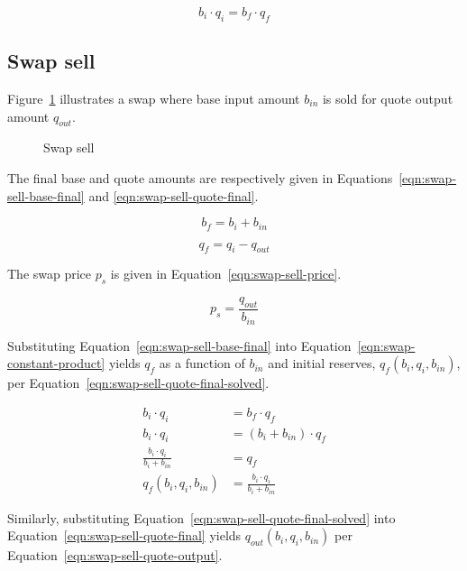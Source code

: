 \documentclass[table, twocolumn]{article}
\begin{document}
\begin{equation}\label{eqn:swap-constant-product}
  b_i \cdot q_i = b_f \cdot q_f
\end{equation}

\subsection{Swap sell}\label{subsec:swap-sell}

Figure~\ref{fig:swap-sell} illustrates a swap where base input amount $b_{in}$ is sold
for quote output amount $q_{out}$.

\begin{figure}[!htb]
	\centering
	
	\caption{Swap sell}\label{fig:swap-sell}
\end{figure}

The final base and quote amounts are respectively given in
Equations~\ref{eqn:swap-sell-base-final} and \ref{eqn:swap-sell-quote-final}.

\begin{equation}\label{eqn:swap-sell-base-final}
	b_f = b_i + b_{in}
\end{equation}

\begin{equation}\label{eqn:swap-sell-quote-final}
  q_f = q_i - q_{out}
\end{equation}

The swap price $p_s$ is given in Equation~\ref{eqn:swap-sell-price}.

\begin{equation}\label{eqn:swap-sell-price}
  p_s = \frac{q_{out}}{b_{in}}
\end{equation}

Substituting Equation~\ref{eqn:swap-sell-base-final} into
Equation~\ref{eqn:swap-constant-product} yields $q_f$ as a function of $b_{in}$ and
initial reserves, $q_f(b_i, q_i, b_{in})$, per
Equation~\ref{eqn:swap-sell-quote-final-solved}.

\begin{align}\label{eqn:swap-sell-quote-final-solved}
  b_i \cdot q_i &= b_f \cdot q_f \nonumber \\
  b_i \cdot q_i &= (b_i + b_{in}) \cdot q_f \nonumber \\
  \frac{b_i \cdot q_i}{b_i + b_{in}} &= q_f \nonumber \\
  q_f(b_i, q_i, b_{in}) &= \frac{b_i \cdot q_i}{b_i + b_{in}}
\end{align}

Similarly, substituting Equation~\ref{eqn:swap-sell-quote-final-solved} into
Equation~\ref{eqn:swap-sell-quote-final} yields $q_{out}(b_i, q_i, b_{in})$
per Equation~\ref{eqn:swap-sell-quote-output}.
\end{document}
